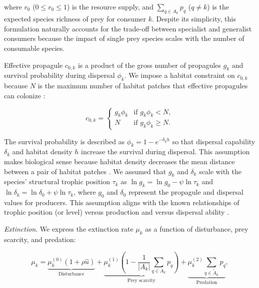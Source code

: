 \documentclass[11pt, class=article, crop=false]{standalone}
\begin{document}
where $r_0$ ($0 \le r_0 \le 1$) is the resource supply, and $\sum_{q \in A_{k}} p_{q}$ ($q \ne k$) is the expected species richness of prey for consumer $k$.
Despite its simplicity, this formulation naturally accounts for the trade-off between specialist and generalist consumers because the impact of single prey species scales with the number of consumable species.

Effective propagule $c_{0,k}$ is a product of the gross number of propagules $g_k$ and survival probability during dispersal $\phi_k$.
We impose a habitat constraint on $c_{0,k}$ because $N$ is the maximum number of habitat patches that effective propagules can colonize \citep{takimoto_effects_2012, terui_spatial_2019}:

\begin{equation}
    c_{0, k} = 
    \begin{cases}
        g_k \phi_k & \text{if $g_k \phi_k < N$},\\
        N & \text{if $g_k \phi_k \ge N$}.
    \end{cases}
    \label{eq:c0-prod}
\end{equation}

The survival probability is described as $\phi_k = 1 - e^{-\delta_k h}$ so that dispersal capability $\delta_k$ and habitat density $h$ increase the survival during dispersal.
This assumption makes biological sense because habitat density decreases the mean distance between a pair of habitat patches \citep{terui_spatial_2019}.
We assumed that $g_k$ and $\delta_k$ scale with the species' structural trophic position $\tau_k$ as $\ln g_k = \ln g_0 - \psi \ln \tau_k$ and $\ln \delta_k = \ln \delta_0 + \psi \ln \tau_k$, where $g_0$ and $\delta_0$ represent the propagule and dispersal values for producers.
This assumption aligns with the known relationships of trophic position (or level) versus production \citep{finlay_stream_2011} and versus dispersal ability \citep{mccann_dynamics_2005}.

\textit{Extinction}. We express the extinction rate $\mu_k$ as a function of disturbance, prey scarcity, and predation:

\begin{equation}
    \mu_{k} = 
        \underbrace{\mu_{k}^{(0)} (1 + \rho \hat{u})}_{\text{Disturbance}} + 
        \underbrace{\mu_{k}^{(1)} \left(1 - \frac{1}{|A_{k}|}\sum_{q\in A_{k}} p_{q}\right)}_{\text{Prey scarcity}} + 
        \underbrace{\mu_{k}^{(2)} \sum_{q \in \tilde{A}_{k}} p_{q}}_{\text{Predation}},
    \label{eq:extn}    
\end{equation}
\end{document}
